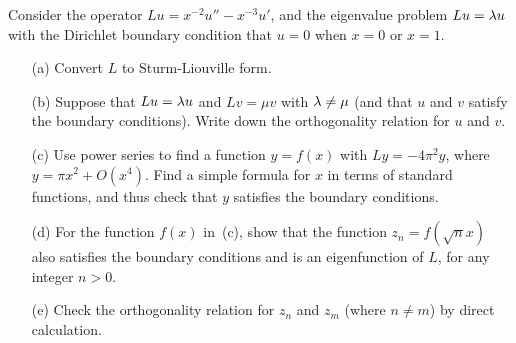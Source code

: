 \documentclass[a4paper]{amsart}
\begin{document}
\begin{exercise}\label{ex-sturm-a}
 Consider the operator $Lu=x^{-2}u''-x^{-3}u'$, and the
 eigenvalue problem $Lu=\lambda u$ with the Dirichlet boundary condition
 that $u=0$ when $x=0$ or $x=1$.
 \begin{itemize}
  \item[(a)] Convert $L$ to Sturm-Liouville form.
  \item[(b)] Suppose that $Lu=\lambda u$ and $Lv=\mu v$ with $\lambda\neq\mu$
   (and that $u$ and $v$ satisfy the boundary conditions).  Write down
   the orthogonality relation for $u$ and $v$.
  \item[(c)] Use power series to find a function $y=f(x)$ with
   $Ly=-4\pi^2y$, where $y=\pi x^2+O(x^4)$.  Find a simple formula for
   $x$ in terms of standard functions, and thus check that $y$
   satisfies the boundary conditions.
  \item[(d)] For the function $f(x)$ in~(c), show that the function
   $z_n=f(\sqrt{n}x)$ also satisfies the boundary conditions and is an
   eigenfunction of $L$, for any integer $n>0$.
  \item[(e)] Check the orthogonality relation for $z_n$ and $z_m$
   (where $n\neq m$) by direct calculation.
 \end{itemize}
\end{exercise}
\end{document}
